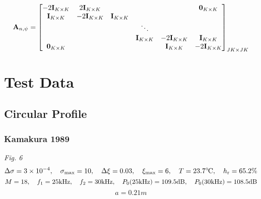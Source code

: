 \documentclass{article}
\begin{document}
$$
\vb{A}_{n,\psi}
=
\mqty[-2\vb{I}_{K\times K} &2\vb{I}_{K\times K} &&&&\vb{0}_{K\times K}  \\
\vb{I}_{K\times K} &-2\vb{I}_{K\times K} &\vb{I}_{K\times K} \\
&&&\ddots \\&&&\vb{I}_{K\times K} &-2\vb{I}_{K\times K} &\vb{I}_{K\times K}\\
\vb{0}_{K\times K}  &&&&\vb{I}_{K\times K} &-2\vb{I}_{K\times K} ]_{JK\times JK}
$$




\section{Test Data}
\subsection{Circular Profile}
\subsubsection{Kamakura 1989}
\emph{Fig. 6}
$$
\Delta \sigma = 3\times 10^{-4}\qc \sigma\st{max} = 10\qc \Delta \xi = 0.03\qc \xi\st{max} = 6\qc T = 23.7 \celsius\qc h\st{r} = 65.2\%
$$
$$
M=18\qc f_1 = 25 \text{kHz}\qc f_2 = 30 \text{kHz}\qc P_0(25 \text{kHz}) = 109.5 \text{dB}\qc P_0(30 \text{kHz})=108.5 \text{dB}
$$
$$
a = 0.21\si{m}
$$


\end{document}
